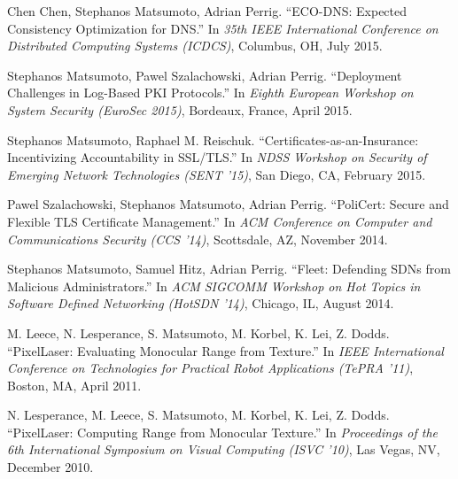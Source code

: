 \documentclass[11pt]{article}
\begin{document}
\renewcommand{\refname}{Refereed Conference and Workshop Papers} %
\begin{thebibliography}{77}

  Chen Chen, Stephanos Matsumoto, Adrian Perrig.
\newblock ``ECO-DNS: Expected Consistency Optimization for DNS.''
\newblock In \emph{35th IEEE International Conference on Distributed Computing
Systems (ICDCS)}, Columbus, OH, July 2015.

  Stephanos Matsumoto, Pawel Szalachowski, Adrian Perrig.
\newblock ``Deployment Challenges in Log-Based PKI Protocols.''
\newblock In \emph{Eighth European Workshop on System Security (EuroSec 2015)},
Bordeaux, France, April 2015.

  Stephanos Matsumoto, Raphael M. Reischuk.
\newblock ``Certificates-as-an-Insurance: Incentivizing Accountability in
SSL/TLS.''
\newblock In \emph{NDSS Workshop on Security of Emerging Network Technologies
(SENT '15)}, San Diego, CA, February 2015.

  Pawel Szalachowski, Stephanos Matsumoto, Adrian Perrig.
\newblock ``PoliCert: Secure and Flexible TLS Certificate Management.''
\newblock In \emph{ACM Conference on Computer and Communications Security (CCS
'14)}, Scottsdale, AZ, November 2014.

  Stephanos Matsumoto, Samuel Hitz, Adrian Perrig.
\newblock ``Fleet: Defending SDNs from Malicious Administrators.''
\newblock In \emph{ACM SIGCOMM Workshop on Hot Topics in Software Defined
Networking (HotSDN '14)}, Chicago, IL, August 2014.

M. Leece, N. Lesperance, S. Matsumoto, M. Korbel, K. Lei, Z. Dodds.
\newblock ``PixelLaser: Evaluating Monocular Range from Texture.''
\newblock In \emph{IEEE International Conference on Technologies for Practical
Robot Applications (TePRA '11)}, Boston, MA, April 2011.

N. Lesperance, M. Leece, S. Matsumoto, M. Korbel, K. Lei, Z. Dodds.
\newblock ``PixelLaser: Computing Range from Monocular Texture.''
\newblock In \emph{Proceedings of the 6th International Symposium on Visual
Computing (ISVC '10)}, Las Vegas, NV, December 2010.
\end{thebibliography}
\end{document}

